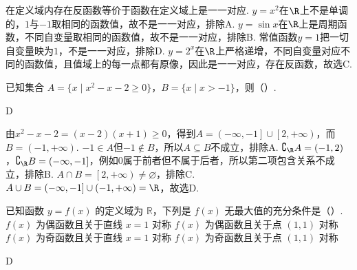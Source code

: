 \begin{solution}
在定义域内存在反函数等价于函数在定义域上是一一对应. \(y=x^2\)在\(\R\)上不是单调的，\(1\)与\(-1\)取相同的函数值，故不是一一对应，排除A. \(y=\sin x\)在\(\R\)上是周期函数，不同自变量取相同的函数值，故不是一一对应，排除B. 常值函数\(y=1\)把一切自变量映为\(1\)，不是一一对应，排除D. \(y=2^x\)在\(\R\)上严格递增，不同自变量对应不同的函数值，且值域上的每一点都有原像，因此是一一对应，存在反函数，故选C.
\end{solution}

\begin{problem}
已知集合 \(A=\{x\mid x^2-x-2\ge0\}\)，\(B=\{x\mid x>-1\}\)，则（\quad）.
\end{problem}

\begin{answer}
D
\end{answer}

\begin{solution}
由\(x^2-x-2=\left( x-2 \right)\left( x+1 \right)\ge 0\)，得到\(A=\left( -\infty,-1 \right]\cup\left[ 2,+\infty \right)\)，而\(B=\left( -1,+\infty \right)\). \(-1\in A\)但\(-1\notin B\)，所以\(A\subseteq B\)不成立，排除A. \(\complement_{\R}A=\left( -1,2 \right)\)，\(\complement_{\R}B=\left( -\infty,-1 \right]\)，例如\(0\)属于前者但不属于后者，所以第二项包含关系不成立，排除B. \(A\cap B=\left[ 2,+\infty \right)\ne\varnothing\)，排除C. \(A\cup B=\left( -\infty,-1 \right]\cup\left( -1,+\infty \right)=\R\)，故选D.
\end{solution}

\begin{problem}
已知函数 \(y=f(x)\) 的定义域为 \(\mathbb R\)，下列是 \(f(x)\) 无最大值的充分条件是（\quad）.
\choices
    {\(f(x)\) 为偶函数且关于直线 \(x=1\) 对称}
    {\(f(x)\) 为偶函数且关于点 \((1,1)\) 对称}
    {\(f(x)\) 为奇函数且关于直线 \(x=1\) 对称}
    {\(f(x)\) 为奇函数且关于点 \((1,1)\) 对称}
\end{problem}

\begin{answer}
D
\end{answer}

